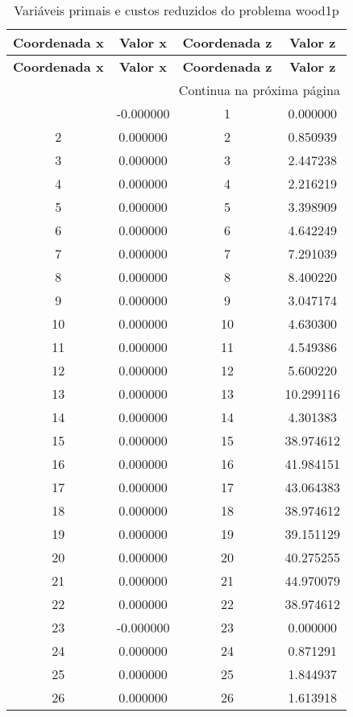 \documentclass[12pt]{article}
\begin{document}
\begin{longtable}{@{}cccc@{}}
\caption{Variáveis primais e custos reduzidos do problema wood1p} \\
\toprule
\textbf{Coordenada x} & \textbf{Valor x} & \textbf{Coordenada z} & \textbf{Valor z} \\
\midrule
\endfirsthead

\toprule
\textbf{Coordenada x} & \textbf{Valor x} & \textbf{Coordenada z} & \textbf{Valor z} \\
\midrule
\endhead

\midrule \multicolumn{4}{r}{{Continua na próxima página}} \\ \midrule
\endfoot

\bottomrule
\endlastfoot
1 & -0.000000 & 1 & 0.000000 \\
2 & 0.000000 & 2 & 0.850939 \\
3 & 0.000000 & 3 & 2.447238 \\
4 & 0.000000 & 4 & 2.216219 \\
5 & 0.000000 & 5 & 3.398909 \\
6 & 0.000000 & 6 & 4.642249 \\
7 & 0.000000 & 7 & 7.291039 \\
8 & 0.000000 & 8 & 8.400220 \\
9 & 0.000000 & 9 & 3.047174 \\
10 & 0.000000 & 10 & 4.630300 \\
11 & 0.000000 & 11 & 4.549386 \\
12 & 0.000000 & 12 & 5.600220 \\
13 & 0.000000 & 13 & 10.299116 \\
14 & 0.000000 & 14 & 4.301383 \\
15 & 0.000000 & 15 & 38.974612 \\
16 & 0.000000 & 16 & 41.984151 \\
17 & 0.000000 & 17 & 43.064383 \\
18 & 0.000000 & 18 & 38.974612 \\
19 & 0.000000 & 19 & 39.151129 \\
20 & 0.000000 & 20 & 40.275255 \\
21 & 0.000000 & 21 & 44.970079 \\
22 & 0.000000 & 22 & 38.974612 \\
23 & -0.000000 & 23 & 0.000000 \\
24 & 0.000000 & 24 & 0.871291 \\
25 & 0.000000 & 25 & 1.844937 \\
26 & 0.000000 & 26 & 1.613918 \\

\end{longtable}
\end{document}
